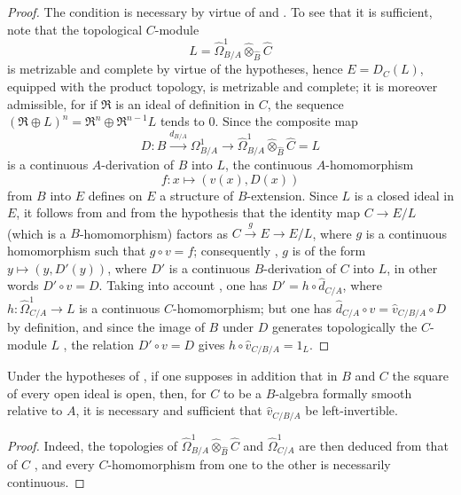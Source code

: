 \begin{proof}
The condition is necessary by virtue of  and . To see that it is sufficient, note that the topological $C$-module
\[
  L=\widehat{\Omega}^1_{B/A}\widehat{\otimes}_{\widehat{B}}\widehat{C}
\]
is metrizable and complete by virtue of the hypotheses, hence $E=D_C(L)$, equipped with the product topology, is
metrizable and complete; it is moreover admissible, for if $\mathfrak{R}$ is an ideal of definition in $C$, the sequence $(\mathfrak{R}\oplus L)^n=\mathfrak{R}^n\oplus\mathfrak{R}^{n-1}L$ tends to $0$. Since the composite map
\[
  D:B\xrightarrow{d_{B/A}}\Omega^1_{B/A}\longrightarrow
  \widehat{\Omega}^1_{B/A}\widehat{\otimes}_{\widehat{B}}\widehat{C}=L
\]
is a continuous $A$-derivation of $B$ into $L$, the continuous $A$-homomorphism
\[
  f:x\longmapsto(v(x),D(x))
\]
from $B$ into $E$ defines on $E$ a structure of $B$-extension. Since $L$ is a closed ideal in $E$, it follows from  and from the hypothesis that the identity map $C\to E/L$ (which is a $B$-homomorphism) factors as $C\xrightarrow{g}E\to E/L$, where $g$ is a continuous homomorphism such that $g\circ v=f$; consequently , $g$ is of the form $y\mapsto(y,D'(y))$, where $D'$ is a continuous $B$-derivation of $C$ into $L$, in other words $D'\circ v=D$. Taking into account , one has $D'=h\circ\widehat{d}_{C/A}$, where $h:\widehat{\Omega}^1_{C/A}\to L$ is a continuous $C$-homomorphism; but one has $\widehat{d}_{C/A}\circ v=\widehat{v}_{C/B/A}\circ D$ by definition, and since the image of $B$ under $D$ generates topologically the $C$-module $L$ , the relation $D'\circ v=D$ gives $h\circ\widehat{v}_{C/B/A}=1_L$.
\end{proof}

\begin{corollary}[20.7.19]
\label{0.20.7.19}
Under the hypotheses of , if one supposes in addition that in $B$ and $C$ the square of every open ideal is open, then, for $C$ to be a $B$-algebra formally smooth relative to $A$, it is necessary and sufficient that $\widehat{v}_{C/B/A}$ be left-invertible.
\end{corollary}

\begin{proof}
Indeed, the topologies of $\widehat{\Omega}^1_{B/A}\widehat{\otimes}_{\widehat{B}}\widehat{C}$ and $\widehat{\Omega}^1_{C/A}$ are then deduced from that of $C$ , and every $C$-homomorphism from one to the other is necessarily continuous.
\end{proof}

